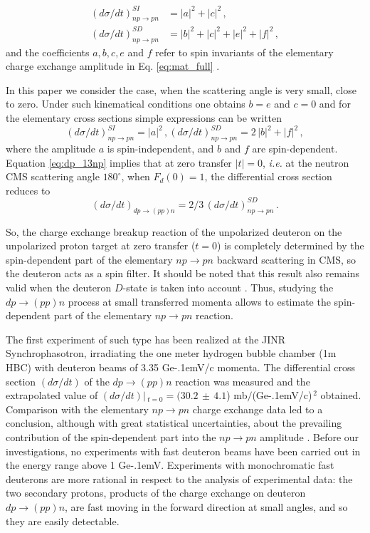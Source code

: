 \documentclass[twocolumn,epjc3]{svjour3}
\newcommand{\np}     {\ensuremath{np \rightarrow pn}\xspace}
\newcommand{\dpchex} {\ensuremath{dp \rightarrow (pp)n}\xspace}
\newcommand{\GeVc}   {Ge\kern-.1emV/c\xspace}
\newcommand{\GeV}    {Ge\kern-.1emV\xspace}
\begin{document}
\begin{equation}
  \begin{split}
    (d\sigma/dt)^{SI}_{\np} &= |a|^2 +|c|^2\,,\\
    (d\sigma/dt)^{SD}_{\np} &= |b|^2 + |c|^2 + |e|^2 + |f|^2\,,
  \end{split}
\end{equation}
and the coefficients $a, b, c, e$ and $f$ refer to spin invariants of the
elementary charge exchange amplitude in Eq. \eqref{eq:mat_full}
\cite{dea72,ala75_2}.

In this paper we consider the case, when the scattering angle is very small,
close to zero. Under such kinematical conditions one obtains $b = e$ and $c = 0$
and for the elementary cross sections simple expressions can be written
\begin{equation}
  (d\sigma/dt)^{SI}_{\np} = |a|^2\,,
  (d\sigma/dt)^{SD}_{\np} = 2\,|b|^2 + |f|^2\,,
\end{equation}
where the amplitude $a$ is spin-independent, and $b$ and $f$ are spin-dependent.
Equation \eqref{eq:dp_13np} implies that at zero transfer $|t| = 0$,
\textit{i.e.} at the neutron CMS scattering angle $180^\circ$, when
$F_d(0) = 1$, the differential cross section reduces to
\begin{equation}
  \label{eq:dp_23np}
  (d\sigma/dt)_{\dpchex} = 2/3\,(d\sigma/dt)^{SD}_{\np}\,.
\end{equation}

So, the charge exchange breakup reaction of the unpolarized deuteron on the
unpolarized proton target at zero transfer ($t = 0$) is completely determined by
the spin-dependent part of the elementary \np backward scattering in CMS, so the
deuteron acts as a spin filter. It should be noted that this result also remains
valid when the deuteron $D$-state is taken into account \cite{led04}. Thus,
studying the \dpchex process at small transferred momenta allows to estimate the
spin-dependent part of the elementary \np reaction.

The first experiment of such type has been realized at the JINR
Synchrophasotron, irradiating the one meter hydrogen bubble chamber (1m HBC)
with deuteron beams of 3.35 \GeVc momenta. The differential cross section
$(d\sigma/dt)$ of the \dpchex reaction was measured and the extra\-polated value
of $(d\sigma/dt)|\,_{t=0}=(30.2\,\pm\,4.1$) mb$/$(\GeVc)$^{\,2}$ obtained.
Comparison with the elementary \np charge exchange data led to a conclusion,
although with great statistical uncertainties, about the prevailing contribution
of the spin-dependent part into the \np amplitude \cite{gla02,gla08}. Before our
investigations, no experiments with fast deuteron beams have been carried out in
the energy range above 1 \GeV. Experiments with monochromatic fast deuterons are
more rational in respect to the analysis of experimental data: the two secondary
protons, products of the charge exchange on deuteron \dpchex, are fast moving in
the forward direction at small angles, and so they are easily detectable.
\end{document}
